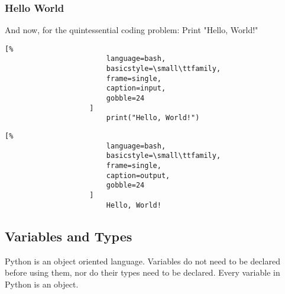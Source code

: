 \documentclass[crop=false,class=book]{standalone}
\begin{document}
            \subsubsection{Hello World}
                And now, for the quintessential coding problem:
                Print "Hello, World!"\newline
                \begin{minipage}[t]{.48\textwidth}
                    \centering
                    \begin{lstlisting}[%
                        language=bash,
                        basicstyle=\small\ttfamily,
                        frame=single,
                        caption=input,
                        gobble=24
                    ]
                        print("Hello, World!")
                    \end{lstlisting}
                \end{minipage}\hfill
                \begin{minipage}[t]{.48\textwidth}
                    \centering
                    \begin{lstlisting}[%
                        language=bash,
                        basicstyle=\small\ttfamily,
                        frame=single,
                        caption=output,
                        gobble=24
                    ]
                        Hello, World!
                \end{lstlisting}
                \end{minipage}
        \subsection{Variables and Types}
            Python is an object oriented language.
            Variables do not need to be declared before using them,
            nor do their types need to be declared.
            Every variable in Python is an object.
\end{document}
